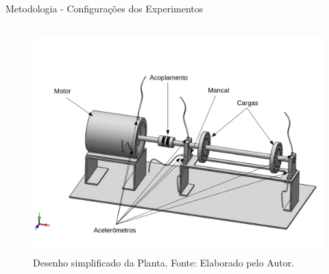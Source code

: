 \documentclass[aspectratio=169]{beamer}
\begin{document}
\begin{frame}{Metodologia - Configurações dos Experimentos}
\begin{columns}
		\begin{column}{0.5\textwidth}
			\begin{figure}[HT]
				\begin{center}
					\includegraphics[scale=.25]{../metodologia/img/lateral_desenho.png}
					\caption{Desenho simplificado da \newline 
					Planta. \newline 
					Fonte: Elaborado pelo Autor.}
					\label{fig:lateral_desenho}
				\end{center}
			\end{figure}
	 	\end{column}
	 \end{columns}
\end{frame}

\end{document}
